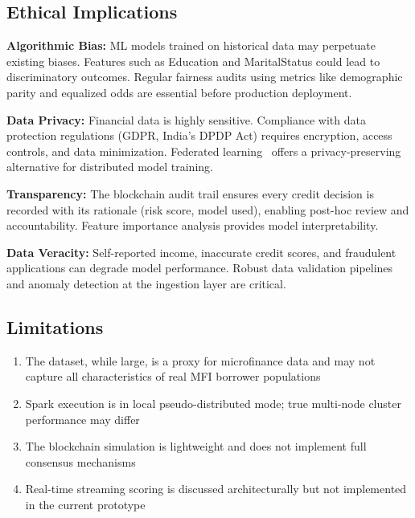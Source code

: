 \documentclass[preprint,12pt,authoryear]{elsarticle}
\begin{document}
\subsection{Ethical Implications}

\textbf{Algorithmic Bias:} ML models trained on historical data may perpetuate existing biases. Features such as Education and MaritalStatus could lead to discriminatory outcomes. Regular fairness audits using metrics like demographic parity and equalized odds are essential before production deployment.

\textbf{Data Privacy:} Financial data is highly sensitive. Compliance with data protection regulations (GDPR, India's DPDP Act) requires encryption, access controls, and data minimization. Federated learning~\cite{yang2019federated} offers a privacy-preserving alternative for distributed model training.

\textbf{Transparency:} The blockchain audit trail ensures every credit decision is recorded with its rationale (risk score, model used), enabling post-hoc review and accountability. Feature importance analysis provides model interpretability.

\textbf{Data Veracity:} Self-reported income, inaccurate credit scores, and fraudulent applications can degrade model performance. Robust data validation pipelines and anomaly detection at the ingestion layer are critical.

\subsection{Limitations}

\begin{enumerate}
    \item The dataset, while large, is a proxy for microfinance data and may not capture all characteristics of real MFI borrower populations
    \item Spark execution is in local pseudo-distributed mode; true multi-node cluster performance may differ
    \item The blockchain simulation is lightweight and does not implement full consensus mechanisms
    \item Real-time streaming scoring is discussed architecturally but not implemented in the current prototype
\end{enumerate}


\end{document}
